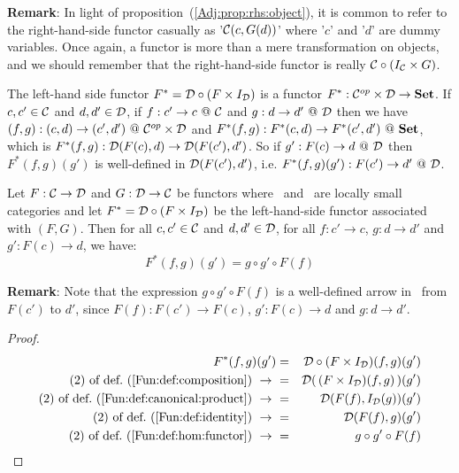 \noindent
{\bf Remark}: In light of proposition~(\ref{Adj:prop:rhs:object}), it is
common to refer to the right-hand-side functor casually as '$\mbox{$\cal C$}(c,G(d))$'
where '$c$' and '$d$' are dummy variables. Once again, a functor is more than 
a mere transformation on objects, and we should remember that the right-hand-side 
functor is really $\mbox{$\cal C$}\circ(I_{\cal C}\times G)$.

The left-hand side functor $F^{*}=\mbox{$\cal D$}\circ(F\times I_{\cal D})$ is a functor
$F^{*}:\mbox{${\cal C}^{op}$}\times\mbox{$\cal D$}\to\mbox{\bf Set}$. If $c,c'\in\mbox{$\cal C$}$ and $d,d'\in\mbox{$\cal D$}$, if 
$f:c'\to c\ @\ \mbox{$\cal C$}$ and $g:d\to d'\ @\ \mbox{$\cal D$}$ then we have $(f,g):(c,d)\to
(c',d')\ @\ \mbox{${\cal C}^{op}$}\times\mbox{$\cal D$}$ and $F^{*}(f,g):F^{*}(c,d)\to F^{*}(c',d')\ @\ \Set$, 
which is $F^{*}(f,g):\mbox{$\cal D$}(F(c),d)\to\mbox{$\cal D$}(F(c'),d')$. So if 
$g':F(c)\to d\ @\ \mbox{$\cal D$}$ then $F^{*}(f,g)(g')$ is well-defined in
$\mbox{$\cal D$}(F(c'),d')$, i.e. $F^{*}(f,g)(g'):F(c')\to d'\ @\ \Dat$.
\begin{prop}\label{Adj:prop:lhs:arrow}
    Let $F:\mbox{$\cal C$}\to\mbox{$\cal D$}$ and $G:\mbox{$\cal D$}\to\mbox{$\cal C$}$ be functors where \Cat\ and \Dat\ 
    are locally small categories and let $F^{*}=\mbox{$\cal D$}\circ(F\times I_{\cal D})$
    be the left-hand-side functor associated with $(F,G)$. Then for all 
    $c,c'\in\mbox{$\cal C$}$ and $d,d'\in\mbox{$\cal D$}$, for all $f:c'\to c$, $g:d\to d'$
    and $g':F(c)\to d$, we have:
        \[
            F^{*}(f,g)(g') = g \circ g'\circ F(f)
        \]
\end{prop}
\noindent
{\bf Remark}: Note that the expression $g\circ g'\circ F(f)$ is a well-defined
arrow in \Dat\ from $F(c')$ to $d'$, since $F(f):F(c')\to F(c)$, $g':F(c)\to d$
and $g:d\to d'$.

\noindent
\begin{proof}
    \begin{eqnarray*}F^{*}(f,g)(g')
        &=&\Dat\circ(F\times I_{\cal D})(f,g)(g')\\
        \mbox{$(2)$ of def.~(\ref{Fun:def:composition})}\ \to\ 
        &=&\Dat(\,(F\times I_{\cal D})(f,g)\,)(g')\\
        \mbox{$(2)$ of def.~(\ref{Fun:def:canonical:product})}\ \to\ 
        &=&\Dat(F(f),I_{\cal D}(g))(g')\\
        \mbox{$(2)$ of def.~(\ref{Fun:def:identity})}\ \to\ 
        &=&\Dat(F(f),g)(g')\\
        \mbox{$(2)$ of def.~(\ref{Fun:def:hom:functor})}\ \to\ 
        &=&g\circ g'\circ F(f)
    \end{eqnarray*}
\end{proof}

